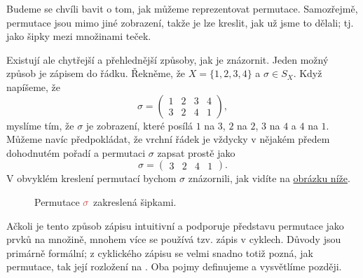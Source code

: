Budeme se chvíli bavit o tom, jak můžeme reprezentovat permutace. Samozřejmě,
permutace jsou mimo jiné zobrazení, takže je lze kreslit, jak už jsme to dělali;
tj. jako šipky mezi množinami teček.

Existují ale chytřejší a přehlednější způsoby, jak je znázornit. Jeden možný
způsob je zápisem do řádku. Řekněme, že $X = \{1,2,3,4\}$ a $\sigma \in S_X$.
Když napíšeme, že
\[
 \sigma = 
 \begin{pmatrix}
  1 & 2 & 3 & 4\\
  3 & 2 & 4 & 1
 \end{pmatrix},
\]
myslíme tím, že $\sigma$ je zobrazení, které posílá $1$ na $3$, $2$ na $2$, $3$
na $4$ a $4$ na $1$. Můžeme navíc předpokládat, že vrchní řádek je vždycky v
nějakém předem dohodnutém pořadí a permutaci $\sigma$ zapsat prostě jako
\[
 \sigma = \begin{pmatrix} 
 3 & 2 & 4 & 1
 \end{pmatrix}. 
\]
V obvyklém kreslení permutací bychom $\sigma$ znázornili, jak vidíte na 
\hyperref[fig:permutace-jako-sipky]{obrázku níže}.
\begin{figure}[h]
 \centering
 \label{fig:permutace-jako-sipky}
 \caption{Permutace $\clr{\sigma}$ zakreslená šipkami.}
\end{figure}

Ačkoli je tento způsob zápisu intuitivní a podporuje představu permutace jako
 prvků na množině, mnohem více se používá tzv. zápis v cyklech.
Důvody jsou primárně formální; z cyklického zápisu se velmi snadno totiž pozná,
jak  permutace, tak její rozložení na . Oba pojmy
definujeme a vysvětlíme později.

